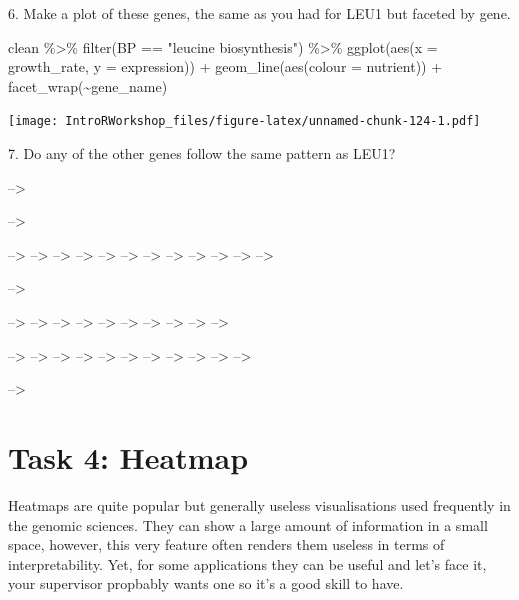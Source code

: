 \documentclass[
]{book}
\newenvironment{Shaded}{\begin{snugshade}}{\end{snugshade}}
\newcommand{\AttributeTok}[1]{\textcolor[rgb]{0.77,0.63,0.00}{#1}}
\newcommand{\FunctionTok}[1]{\textcolor[rgb]{0.00,0.00,0.00}{#1}}
\newcommand{\NormalTok}[1]{#1}
\newcommand{\SpecialCharTok}[1]{\textcolor[rgb]{0.00,0.00,0.00}{#1}}
\newcommand{\StringTok}[1]{\textcolor[rgb]{0.31,0.60,0.02}{#1}}
\begin{document}
6. Make a plot of these genes, the same as you had for LEU1 but faceted by gene.

\begin{Shaded}
\begin{Highlighting}[]
\NormalTok{clean }\SpecialCharTok{\%\textgreater{}\%}
  \FunctionTok{filter}\NormalTok{(BP }\SpecialCharTok{==} \StringTok{"leucine biosynthesis"}\NormalTok{) }\SpecialCharTok{\%\textgreater{}\%}
  \FunctionTok{ggplot}\NormalTok{(}\FunctionTok{aes}\NormalTok{(}\AttributeTok{x =}\NormalTok{ growth\_rate, }\AttributeTok{y =}\NormalTok{ expression)) }\SpecialCharTok{+}
    \FunctionTok{geom\_line}\NormalTok{(}\FunctionTok{aes}\NormalTok{(}\AttributeTok{colour =}\NormalTok{ nutrient)) }\SpecialCharTok{+}
    \FunctionTok{facet\_wrap}\NormalTok{(}\SpecialCharTok{\textasciitilde{}}\NormalTok{gene\_name)}
\end{Highlighting}
\end{Shaded}

\texttt{[image: IntroRWorkshop\_files/figure-latex/unnamed-chunk-124-1.pdf]}

7. Do any of the other genes follow the same pattern as LEU1?

--\textgreater{}

--\textgreater{}

--\textgreater{}
--\textgreater{}
--\textgreater{}
--\textgreater{}
--\textgreater{}
--\textgreater{}
--\textgreater{}
--\textgreater{}
--\textgreater{}
--\textgreater{}
--\textgreater{}
--\textgreater{}

--\textgreater{}

--\textgreater{}
--\textgreater{}
--\textgreater{}
--\textgreater{}
--\textgreater{}
--\textgreater{}
--\textgreater{}
--\textgreater{}
--\textgreater{}
--\textgreater{}

--\textgreater{}
--\textgreater{}
--\textgreater{}
--\textgreater{}
--\textgreater{}
--\textgreater{}
--\textgreater{}
--\textgreater{}
--\textgreater{}
--\textgreater{}
--\textgreater{}

--\textgreater{}

\hypertarget{task-4-heatmap}{%
\section*{Task 4: Heatmap}\label{task-4-heatmap}}

Heatmaps are quite popular but generally useless visualisations used frequently in the genomic sciences. They can show a large amount of information in a small space, however, this very feature often renders them useless in terms of interpretability. Yet, for some applications they can be useful and let's face it, your supervisor propbably wants one so it's a good skill to have.
\end{document}
